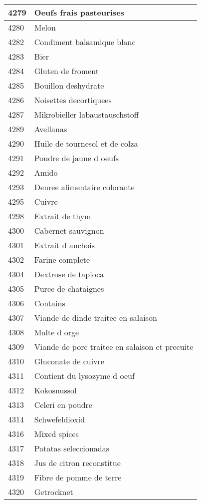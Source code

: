 \begin{longtable}{|l|l|}
4279 & Oeufs frais pasteurises \\ \hline 
4280 & Melon \\ \hline 
4282 & Condiment balsamique blanc \\ \hline 
4283 & Bier \\ \hline 
4284 & Gluten de froment \\ \hline 
4285 & Bouillon deshydrate \\ \hline 
4286 & Noisettes decortiquees \\ \hline 
4287 & Mikrobieller labaustauschstoff \\ \hline 
4289 & Avellanas \\ \hline 
4290 & Huile de tournesol et de colza \\ \hline 
4291 & Poudre de jaune d oeufs \\ \hline 
4292 & Amido \\ \hline 
4293 & Denree alimentaire colorante \\ \hline 
4295 & Cuivre \\ \hline 
4298 & Extrait de thym \\ \hline 
4300 & Cabernet sauvignon \\ \hline 
4301 & Extrait d anchois \\ \hline 
4302 & Farine complete \\ \hline 
4304 & Dextrose de tapioca \\ \hline 
4305 & Puree de chataignes \\ \hline 
4306 & Contains \\ \hline 
4307 & Viande de dinde traitee en salaison \\ \hline 
4308 & Malte d orge \\ \hline 
4309 & Viande de porc traitee en salaison et precuite \\ \hline 
4310 & Gluconate de cuivre \\ \hline 
4311 & Contient du lysozyme d oeuf \\ \hline 
4312 & Kokosnussol \\ \hline 
4313 & Celeri en poudre \\ \hline 
4314 & Schwefeldioxid \\ \hline 
4316 & Mixed spices \\ \hline 
4317 & Patatas seleccionadas \\ \hline 
4318 & Jus de citron reconstitue \\ \hline 
4319 & Fibre de pomme de terre \\ \hline 
4320 & Getrocknet \\ \hline 

\end{longtable}
